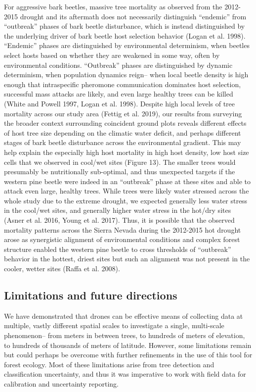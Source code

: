 \documentclass[]{article}
\begin{document}
For aggressive bark beetles, massive tree mortality as observed from the
2012-2015 drought and its aftermath does not necessarily distinguish
``endemic'' from ``outbreak'' phases of bark beetle disturbance, which
is instead distinguished by the underlying driver of bark beetle host
selection behavior (Logan et al. 1998). ``Endemic'' phases are
distinguished by environmental determinism, when beetles select hosts
based on whether they are weakened in some way, often by environmental
conditions. ``Outbreak'' phases are distinguished by dynamic
determinism, when population dynamics reign-- when local beetle density
is high enough that intraspecific pheromone communication dominates host
selection, successful mass attacks are likely, and even large healthy
trees can be killed (White and Powell 1997, Logan et al. 1998). Despite
high local levels of tree mortality across our study area (Fettig et al.
2019), our results from surveying the broader context surrounding
coincident ground plots reveals different effects of host tree size
depending on the climatic water deficit, and perhaps different stages of
bark beetle disturbance across the environmental gradient. This may help
explain the especially high host mortality in high host density, low
host size cells that we observed in cool/wet sites (Figure 13). The
smaller trees would presumably be nutritionally sub-optimal, and thus
unexpected targets if the western pine beetle were indeed in an
``outbreak'' phase at these sites and able to attack even large, healthy
trees. While trees were likely water stressed across the whole study due
to the extreme drought, we expected generally less water stress in the
cool/wet sites, and generally higher water stress in the hot/dry sites
(Asner et al. 2016, Young et al. 2017). Thus, it is possible that the
observed mortality patterns across the Sierra Nevada during the
2012-2015 hot drought arose as synergistic alignment of environmental
conditions and complex forest structure enabled the western pine beetle
to cross thresholds of ``outbreak'' behavior in the hottest, driest
sites but such an alignment was not present in the cooler, wetter sites
(Raffa et al. 2008).

\subsection{Limitations and future
directions}\label{limitations-and-future-directions}

We have demonstrated that drones can be effective means of collecting
data at multiple, vastly different spatial scales to investigate a
single, multi-scale phenomenon-- from meters in between trees, to
hundreds of meters of elevation, to hundreds of thousands of meters of
latitude. However, some limitations remain but could perhaps be overcome
with further refinements in the use of this tool for forest ecology.
Most of these limitations arise from tree detection and classification
uncertainty, and thus it was imperative to work with field data for
calibration and uncertainty reporting.
\end{document}
